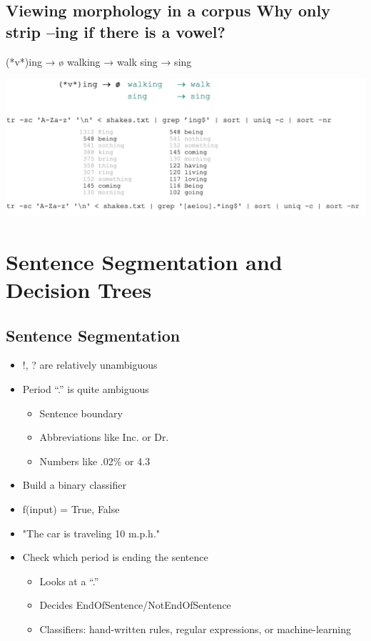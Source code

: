 \documentclass[11pt]{article}
\theoremstyle{definition}
\begin{document}
\subsection{Viewing morphology in a corpus
Why only strip –ing if there is a vowel?}

(*v*)ing → ø walking → walk
sing → sing

\includegraphics[width=\textwidth]{5.png}

\section{Sentence Segmentation
and Decision Trees}
\subsection{Sentence Segmentation}
\begin{itemize}
  \item !, ? are relatively unambiguous
  \item Period “.” is quite ambiguous
  \begin{itemize}
    \item Sentence boundary
    \item Abbreviations like Inc. or Dr.
    \item Numbers like .02\% or 4.3
  \end{itemize}
  \item Build a binary classifier
  \item f(input) = {True, False}
  \item "The car is traveling 10 m.p.h." 
  \item Check which period is ending the sentence
  \begin{itemize}
    \item Looks at a “.”
    \item Decides EndOfSentence/NotEndOfSentence
    \item Classifiers: hand-written rules, regular expressions, or machine-learning
  \end{itemize}
\end{itemize}
\end{document}
